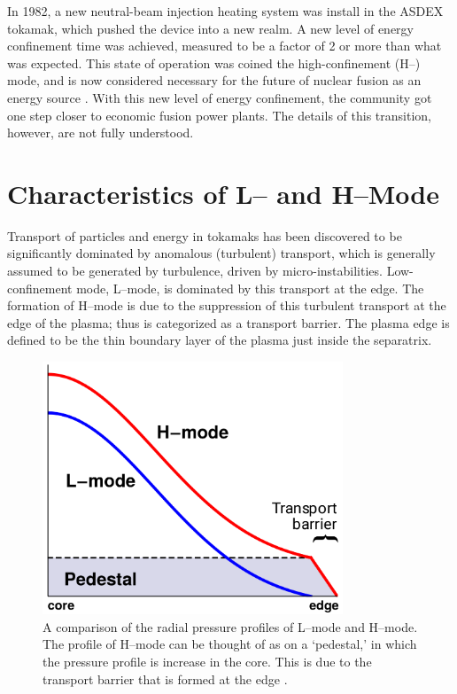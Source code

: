 In 1982, a new neutral-beam injection heating system was install in the ASDEX tokamak, which pushed the device into a new realm.
A new level of energy confinement time was achieved, measured to be a factor of 2 or more than what was expected.
This state of operation was coined the high-confinement (H--) mode, and is now considered necessary for the future of nuclear fusion as an energy source \cite{arnoux_how_2009} \cite{wagner_development_1984}.
With this new level of energy confinement, the community got one step closer to economic fusion power plants.
The details of this transition, however, are not fully understood.

\section{Characteristics of L-- and H--Mode}
Transport of particles and energy in tokamaks has been discovered to be significantly dominated by anomalous (turbulent) transport, which is generally assumed to be generated by turbulence, driven by micro-instabilities.
Low-confinement mode, L--mode, is dominated by this transport at the edge.
The formation of H--mode is due to the suppression of this turbulent transport at the edge of the plasma; thus is categorized as a transport barrier.
The plasma edge is defined to be the thin boundary layer of the plasma just inside the separatrix.

\begin{figure}[b] %
\begin{minipage}{0.49\linewidth}
	\centering
	\includegraphics[width=0.8\textwidth]{../Graphics/L-mode_H-mode_compare.png}
\end{minipage}
\hfill
\begin{minipage}{0.49\linewidth}
	\caption{A comparison of the radial pressure profiles of L--mode and H--mode.
	The profile of H--mode can be thought of as on a `pedestal,' in which the pressure profile is increase in the core.
	This is due to the transport barrier that is formed at the edge \cite{weymiens_bifurcation_2014}.}
	\label{fig:L-mode_H-mode_compare}
\end{minipage}
\end{figure}

